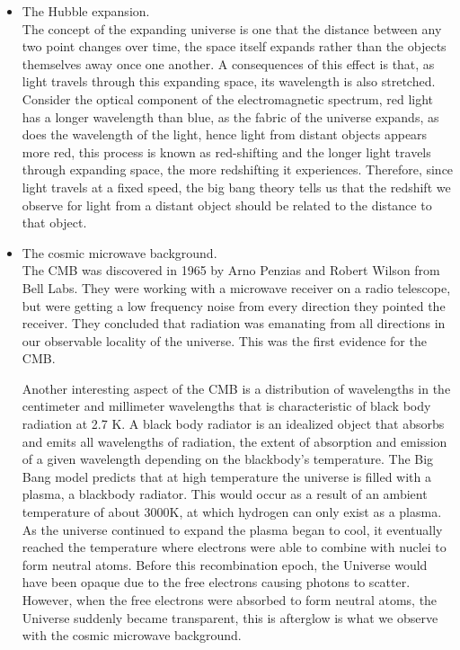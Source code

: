 \begin{itemize}
\item The Hubble expansion. \\ The concept of the expanding universe is one that the distance between any two point changes over time, the space itself expands rather than the objects themselves away once one another. A consequences of this effect is that, as light travels through this expanding space, its wavelength is also stretched. Consider the optical component of the electromagnetic spectrum, red light has a longer wavelength than blue, as the fabric of the universe expands, as does the wavelength of the light, hence light from distant objects appears more red, this process is known as red-shifting and the longer light travels through expanding space, the more redshifting it experiences. \cite{1} \cite{10}
Therefore, since light travels at a fixed speed, the big bang theory tells us that the redshift we observe for light from a distant object should be related to the distance to that object. \cite{11} \cite{10}
\item The cosmic microwave background. \\ The CMB was discovered in 1965 by Arno Penzias and Robert Wilson from Bell Labs. They were working with a microwave receiver on a radio telescope, but were getting a low frequency noise from every direction they pointed the receiver. They concluded that radiation was emanating from all directions in our observable locality of the universe.\cite{10} This was the first evidence for the CMB. \par Another interesting aspect of the CMB is a distribution of wavelengths in the centimeter and millimeter wavelengths that is characteristic of black body radiation at 2.7 K. A black body radiator is an idealized object that absorbs and emits all wavelengths of radiation, the extent of absorption and emission of a given wavelength depending on the blackbody's temperature. The Big Bang model predicts that at high temperature the universe is filled with a plasma, a blackbody radiator. This would occur as a result of an ambient temperature of about 3000K, at which hydrogen can only exist as a plasma.
As the universe continued to expand the plasma began to cool, it eventually reached the temperature where electrons were able to combine with nuclei to form neutral atoms.\cite{10} \cite{11} Before this recombination epoch, the Universe would have been opaque due to the free electrons causing photons to scatter. However, when the free electrons were absorbed to form neutral atoms, the Universe suddenly became transparent, this is afterglow is what we observe with the cosmic microwave background.

\end{itemize}
